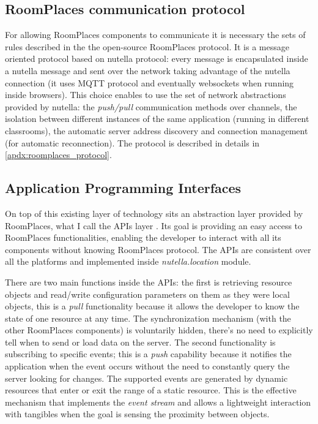 \subsection{RoomPlaces communication protocol}
For allowing RoomPlaces components to communicate it is necessary the sets of rules described in the the open-source RoomPlaces protocol. It is a message oriented protocol based on nutella protocol: every message is encapsulated inside a nutella message and sent over the network taking advantage of the nutella connection (it uses MQTT protocol and eventually websockets when running inside browsers). This choice enables to use the set of network abstractions provided by nutella: the \textit{push/pull} communication methods over channels, the isolation between different instances of the same application (running in different classrooms), the automatic server address discovery and connection management (for automatic reconnection). The protocol is described in details in \autoref{apdx:roomplaces_protocol}.

\subsection{Application Programming Interfaces}
On top of this existing layer of technology sits an abstraction layer provided by RoomPlaces, what I call the APIs layer \cite{nutella_location}. Its goal is providing an easy access to RoomPlaces functionalities, enabling the developer to interact with all its components without knowing RoomPlaces protocol. The APIs are consistent over all the platforms and implemented inside \textit{nutella.location} module.

There are two main functions inside the APIs: the first is retrieving resource objects and read/write configuration parameters on them as they were local objects, this is a \textit{pull} functionality because it allows the developer to know the state of one resource at any time. The synchronization mechanism (with the other RoomPlaces components) is voluntarily hidden, there's no need to explicitly tell when to send or load data on the server. The second functionality is subscribing to specific events; this is a \textit{push} capability because it notifies the application when the event occurs without the need to constantly query the server looking for changes. The supported events are generated by dynamic resources that enter or exit the range of a static resource. This is the effective mechanism that implements the \textit{event stream} and allows a lightweight interaction with tangibles when the goal is sensing the proximity between objects.

